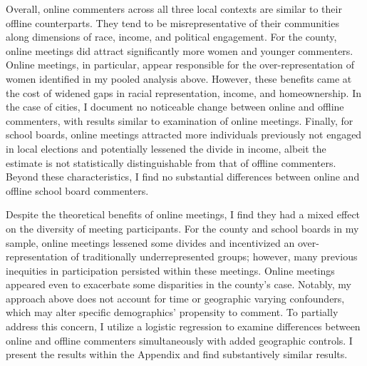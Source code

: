 Overall, online commenters across all three local contexts are similar to their offline counterparts. They tend to be misrepresentative of their communities along dimensions of race, income, and political engagement. For the county, online meetings did attract significantly more women and younger commenters. Online meetings, in particular, appear responsible for the over-representation of women identified in my pooled analysis above. However, these benefits came at the cost of widened gaps in racial representation, income, and homeownership. In the case of cities, I document no noticeable change between online and offline commenters, with results similar to \citet{einsteinStillMutedLimited2022} examination of online meetings. Finally, for school boards, online meetings attracted more individuals previously not engaged in local elections and potentially lessened the divide in income, albeit the estimate is not statistically distinguishable from that of offline commenters. Beyond these characteristics, I find no substantial differences between online and offline school board commenters.

Despite the theoretical benefits of online meetings, I find they had a mixed effect on the diversity of meeting participants. For the county and school boards in my sample, online meetings lessened some divides and incentivized an over-representation of traditionally underrepresented groups; however, many previous inequities in participation persisted within these meetings. Online meetings appeared even to exacerbate some disparities in the county's case. Notably, my approach above does not account for time or geographic varying confounders, which may alter specific demographics' propensity to comment. To partially address this concern, I utilize a logistic regression to examine differences between online and offline commenters simultaneously with added geographic controls. I present the results within the Appendix and find substantively similar results.

